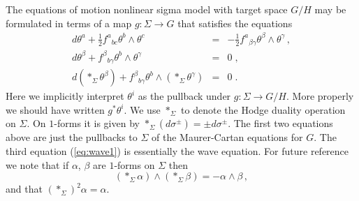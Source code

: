 \documentclass[a4paper,12pt]{article}
\newcommand{\hodge}{*_{\Sigma}}
\newcommand{\half}{\frac{1}{2}}
\begin{document}
The equations of motion nonlinear sigma model with target space $G/H$
may be formulated in terms of a map $g:\Sigma \to G$ that satisfies the
equations
\begin{eqnarray}
    d\theta^{a} + \half f^{a}{}_{bc}\theta^{b}\wedge \theta^{c}
    & = & - \half f^{a}{}_{\beta\gamma} 
    \theta^{\beta}\wedge\theta^{\gamma}\,,
    \label{eq:Hcurv1}  \\
    d\theta^{\beta} + f^{\beta}{}_{b\gamma} 
    \theta^{b}\wedge\theta^{\gamma} & = & 0\;, \\
    \label{eq:covm1}
    d(\hodge\theta^{\beta}) + f^{\beta}{}_{b\gamma} 
    \theta^{b}\wedge (\hodge\theta^{\gamma}) & = & 0\;.
    \label{eq:wave1} 
\end{eqnarray}
Here we implicitly interpret $\theta^{i}$ as the pullback under 
$g:\Sigma\to G/H$. More properly we should have 
written $g^{*}\theta^{i}$. 
We use $\hodge$ to denote the Hodge duality operation on $\Sigma$. On 
$1$-forms it is given by $\hodge(d\sigma^{\pm})= \pm d\sigma^{\pm}$. 
The first two equations above are just the pullbacks to $\Sigma$ of the 
Maurer-Cartan equations for $G$. The third equation (\ref{eq:wave1}) 
is essentially the wave equation.
For future reference we note that if $\alpha$, $\beta$ are $1$-forms on 
$\Sigma$ then 
\begin{equation}
    (\hodge \alpha)\wedge(\hodge\beta) = - 
    \alpha\wedge\beta\,,
    \label{eq:hodge}
\end{equation}
and that $(\hodge)^{2}\alpha=\alpha$.
\end{document}
